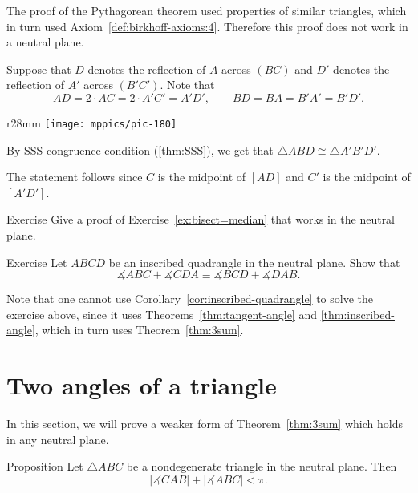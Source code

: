 The proof of the Pythagorean theorem used properties of similar triangles, which in turn used Axiom~\ref{def:birkhoff-axioms:4}. 
Therefore this proof does not work in a neutral plane.

Suppose that $D$ denotes the reflection of $A$ across $(BC)$
and $D'$ denotes the reflection of $A'$ across $(B'C')$.
Note that 
$$
AD=2\cdot AC=2\cdot A'C'=A'D',\qquad
BD=BA=B'A'=B'D'.
$$

{

\begin{wrapfigure}{r}{28mm}
\vskip-0mm
\centering
\texttt{[image: mppics/pic-180]}
\end{wrapfigure}

By SSS congruence condition (\ref{thm:SSS}), 
we get that $\triangle ABD\cong \triangle A'B'D'$.

The statement follows since $C$ is the midpoint of $[AD]$
and $C'$ is the midpoint of $[A'D']$.  
\qeds

\begin{thm}{Exercise}\label{ex:abs-bisect=median}
Give a proof of Exercise~\ref{ex:bisect=median}
that works in the neutral plane. 
\end{thm}

}

\begin{thm}{Exercise}\label{ex:abs-inscibed}
Let $ABCD$ be an inscribed quadrangle in the neutral plane.
Show that
$$\measuredangle ABC+\measuredangle CDA\equiv \measuredangle BCD+\measuredangle DAB.$$

\end{thm}

Note that one cannot use Corollary~\ref{cor:inscribed-quadrangle} to solve the exercise above,
since it uses Theorems~\ref{thm:tangent-angle} and \ref{thm:inscribed-angle},
which in turn uses Theorem~\ref{thm:3sum}.


\section*{Two angles of a triangle}

In this section, we will prove a weaker form of Theorem~\ref{thm:3sum}
which holds in any neutral plane.

\begin{thm}{Proposition}\label{prop:2sum}
Let $\triangle ABC$ be a nondegenerate triangle in the neutral plane.
Then 
$$|\measuredangle CAB|+|\measuredangle ABC|< \pi.$$

\end{thm}

